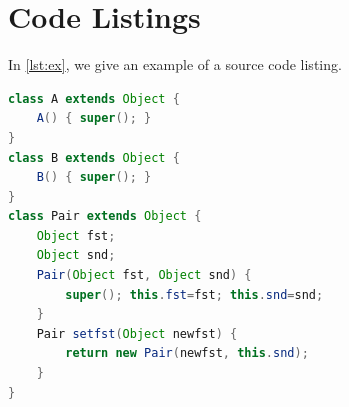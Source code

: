 \section{Code Listings}

In \autoref{lst:ex}, we give an example of a source code listing. 

\begin{lstlisting}[language=Java,float=htb,caption={Java source code},label={lst:ex}]
class A extends Object {
	A() { super(); }
}
class B extends Object {
	B() { super(); }
}
class Pair extends Object {
	Object fst;
	Object snd;
	Pair(Object fst, Object snd) {
		super(); this.fst=fst; this.snd=snd;
	}
	Pair setfst(Object newfst) {
		return new Pair(newfst, this.snd);
	}
}
\end{lstlisting}
